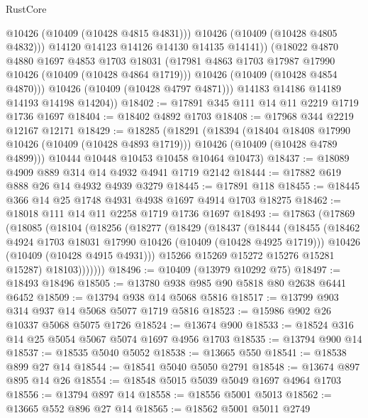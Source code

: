 \begin{lexlean}{RustCore}
\begin{coremodule}
                  @10426
                  (@10409 (@10428 @4815 @4831)))
                @10426
                (@10409 (@10428 @4805 @4832)))
              @14120
              @14123
              @14126
              @14130
              @14135
              @14141))
          (@18022
            @4870
            @4880
            @1697
            @4853
            @1703
            @18031
            (@17981 @4863 @1703 @17987 @17990 @10426 (@10409 (@10428 @4864 @1719)))
            @10426
            (@10409 (@10428 @4854 @4870)))
          @10426
          (@10409 (@10428 @4797 @4871)))
        @14183
        @14186
        @14189
        @14193
        @14198
        @14204))
@18402 := @17891 @345 @111 @14 @11 @2219 @1719 @1736 @1697
@18404 := @18402 @4892 @1703
@18408 := @17968 @344 @2219 @12167 @12171
@18429 := @18285
    (@18291
      (@18394
        (@18404 @18408 @17990 @10426 (@10409 (@10428 @4893 @1719)))
        @10426
        (@10409 (@10428 @4789 @4899)))
      @10444
      @10448
      @10453
      @10458
      @10464
      @10473)
@18437 := @18089 @4909 @889 @314 @14 @4932 @4941 @1719 @2142
@18444 := @17882 @619 @888 @26 @14 @4932 @4939 @3279
@18445 := @17891 @118
@18455 := @18445 @366 @14 @25 @1748 @4931 @4938 @1697 @4914 @1703 @18275
@18462 := @18018 @111 @14 @11 @2258 @1719 @1736 @1697
@18493 := @17863
    (@17869
      (@18085
        (@18104
          (@18256
            (@18277
              (@18429
                (@18437
                  (@18444
                    (@18455
                      (@18462 @4924 @1703 @18031 @17990 @10426 (@10409 (@10428 @4925 @1719)))
                      @10426
                      (@10409 (@10428 @4915 @4931)))
                    @15266
                    @15269
                    @15272
                    @15276
                    @15281
                    @15287)
                  @18103)))))))
@18496 := @10409 (@13979 @10292 @75)
@18497 := @18493 @18496
@18505 := @13780 @938 @985 @90 @5818 @80 @2638 @6441 @6452
@18509 := @13794 @938 @14 @5068 @5816
@18517 := @13799 @903 @314 @937 @14 @5068 @5077 @1719 @5816
@18523 := @15986 @902 @26 @10337 @5068 @5075 @1726
@18524 := @13674 @900
@18533 := @18524 @316 @14 @25 @5054 @5067 @5074 @1697 @4956 @1703
@18535 := @13794 @900 @14
@18537 := @18535 @5040 @5052
@18538 := @13665 @550
@18541 := @18538 @899 @27 @14
@18544 := @18541 @5040 @5050 @2791
@18548 := @13674 @897 @895 @14 @26
@18554 := @18548 @5015 @5039 @5049 @1697 @4964 @1703
@18556 := @13794 @897 @14
@18558 := @18556 @5001 @5013
@18562 := @13665 @552 @896 @27 @14
@18565 := @18562 @5001 @5011 @2749

\end{coremodule}
\end{lexlean}
